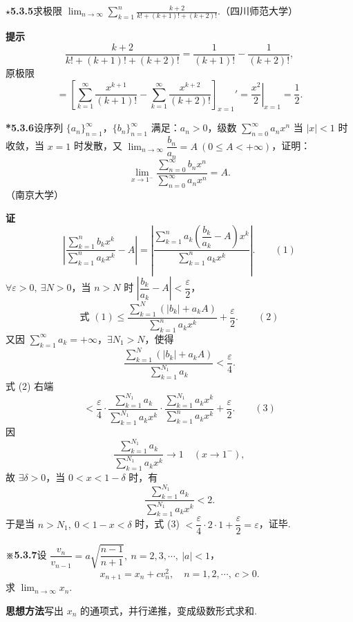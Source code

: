 \documentclass[UTF8,12pt,a4paper,fontset=fandol]{ctexart}
\begin{document}
\noindent\textbf{\(\star\)5.3.5}\quad 求极限 $\displaystyle\lim_{n\to\infty}\sum_{k=1}^n\frac{k+2}{k!+(k+1)!+(k+2)!}$.（四川师范大学）

\noindent\textbf{提示}\quad
\[
  \frac{k+2}{k!+(k+1)!+(k+2)!}
  =\frac1{(k+1)!}-\frac1{(k+2)!},
\]
原极限
\[
  =\left[\sum_{k=1}^{\infty}\frac{x^{k+1}}{(k+1)!}
  -\sum_{k=1}^{\infty}\frac{x^{k+2}}{(k+2)!}\right]_{x=1}'
  =\left.\frac{x^2}{2}\right|_{x=1}
  =\frac12.
\]

\noindent\textbf{*5.3.6}\quad 设序列 $\{a_n\}_{n=1}^{\infty}$，$\{b_n\}_{n=1}^{\infty}$ 满足：$a_n>0$，级数 $\displaystyle\sum_{n=0}^{\infty}a_nx^n$ 当 $|x|<1$ 时收敛，当 $x=1$ 时发散，又 $\displaystyle\lim_{n\to\infty}\dfrac{b_n}{a_n}=A\ (0\le A<+\infty)$，证明：
\[
  \lim_{x\to1^-}\frac{\displaystyle\sum_{n=0}^{\infty}b_nx^n}
  {\displaystyle\sum_{n=0}^{\infty}a_nx^n}=A.
\]
（南京大学）

\noindent\textbf{证}\quad
\[
  \left|\frac{\displaystyle\sum_{k=1}^n b_kx^k}{\displaystyle\sum_{k=1}^n a_kx^k}-A\right|
  =
  \left|\frac{\displaystyle\sum_{k=1}^n a_k\left(\dfrac{b_k}{a_k}-A\right)x^k}
  {\displaystyle\sum_{k=1}^n a_kx^k}\right|. \qquad(1)
\]
$\forall\varepsilon>0,\ \exists N>0$，当 $n>N$ 时 $\left|\dfrac{b_k}{a_k}-A\right|<\dfrac\varepsilon2$，
\[
  \text{式 }(1)\le
  \frac{\displaystyle\sum_{k=1}^N(|b_k|+a_kA)}
  {\displaystyle\sum_{k=1}^n a_kx^k}
  +\frac\varepsilon2. \qquad(2)
\]
又因 $\displaystyle\sum_{k=1}^{\infty}a_k=+\infty$，$\exists N_1>N$，使得
\[
  \frac{\displaystyle\sum_{k=1}^{N}(|b_k|+a_kA)}
  {\displaystyle\sum_{k=1}^{N_1}a_k}<\frac\varepsilon4.
\]
式 (2) 右端
\[
  <\frac\varepsilon4\cdot
  \frac{\displaystyle\sum_{k=1}^{N_1}a_k}{\displaystyle\sum_{k=1}^{N_1}a_kx^k}\cdot
  \frac{\displaystyle\sum_{k=1}^{N_1}a_kx^k}{\displaystyle\sum_{k=1}^{n}a_kx^k}
  +\frac\varepsilon2. \qquad(3)
\]
因
\[
  \frac{\displaystyle\sum_{k=1}^{N_1}a_k}
  {\displaystyle\sum_{k=1}^{N_1}a_kx^k}\to1\quad(x\to1^-),
\]
故 $\exists\delta>0$，当 $0<x<1-\delta$ 时，有
\[
  \frac{\displaystyle\sum_{k=1}^{N_1}a_k}
  {\displaystyle\sum_{k=1}^{N_1}a_kx^k}<2.
\]
于是当 $n>N_1,\ 0<1-x<\delta$ 时，式 (3)
$<\dfrac\varepsilon4\cdot2\cdot1+\dfrac\varepsilon2=\varepsilon$，证毕.

\noindent\textbf{※5.3.7}\quad 设 $\dfrac{v_n}{v_{n-1}}=a\sqrt{\dfrac{n-1}{n+1}},\ n=2,3,\cdots,\ |a|<1$，
\[
  x_{n+1}=x_n+cv_n^2,\quad n=1,2,\cdots,\ c>0.
\]
求 $\displaystyle\lim_{n\to\infty}x_n$.

\noindent\textbf{思想方法}\quad 写出 $x_n$ 的通项式，并行递推，变成级数形式求和.
\end{document}
